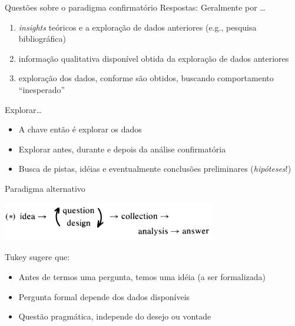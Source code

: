 \documentclass{beamer}
\begin{document}
\begin{frame}{Questões sobre o paradigma confirmatório}
  Respostas: Geralmente por \ldots
  \begin{enumerate}
  \item  {\em insights} teóricos e a exploração de dados
    anteriores (e.g., pesquisa bibliográfica)
  \item informação qualitativa disponível obtida da exploração de
    dados anteriores
  \item exploração dos dados, conforme são obtidos, buscando
    comportamento ``inesperado''
  \end{enumerate}
\end{frame}

\begin{frame}{Explorar\ldots}
  \begin{itemize}
  \item A chave então é explorar os dados
  \item Explorar antes, durante e depois da análise confirmatória
  \item Busca de pistas, idéias e eventualmente conclusões
    preliminares ({\em hipóteses}!)
  \end{itemize}
\end{frame}

\begin{frame}{Paradigma alternativo}
  \begin{center}
    \includegraphics[width=0.7\textwidth]{tukey2}
  \end{center}

Tukey sugere que:
  \begin{itemize}
  \item Antes de termos uma pergunta, temos uma idéia (a ser
    formalizada)
  \item Pergunta formal depende dos dados disponíveis
  \item Questão pragmática, independe do desejo ou vontade
  \end{itemize}
\end{frame}
\end{document}
